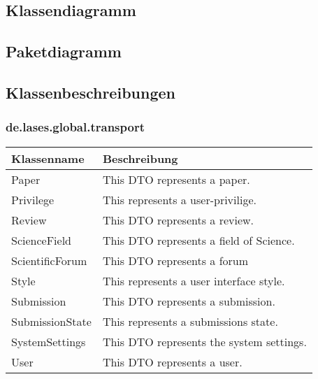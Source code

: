 
\newcommand{\classtable}[1]{\begin{longtable}[H]{|m{5cm}|m{9cm}|}
		\hline
		\textbf{Klassenname} & \textbf{Beschreibung} \\
		\hline
		\hline
		#1
	\end{longtable}
}

\newcommand{\classentry}[2]{#1 & #2 \\
	\hline}


\subsection{Klassendiagramm}

\subsection{Paketdiagramm}

\subsection{Klassenbeschreibungen}

\subsubsection{de.lases.global.transport}

\classtable{
	\classentry{Paper}{This DTO represents a paper.}
	\classentry{Privilege}{This represents a user-privilige.}
	\classentry{Review}{This DTO represents a review.}
	\classentry{ScienceField}{This DTO represents a field of Science.}
	\classentry{ScientificForum}{This DTO represents a forum}
	\classentry{Style}{This represents a user interface style.}
	\classentry{Submission}{This DTO represents a submission.}
	\classentry{SubmissionState}{This represents a submissions state.}
	\classentry{SystemSettings}{This DTO represents the system settings.}
	\classentry{User}{This DTO represents a user.}
}